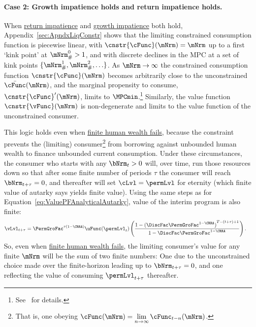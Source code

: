 \documentclass[BufferStockTheory]{subfiles}
\begin{document}
\paragraph{Case 2: Growth impatience holds and return impatience holds.}
When  \hyperlink{RIC}{return impatience} and  \hyperlink{GIC}{growth impatience} both hold, Appendix~\ref{sec:ApndxLiqConstr} shows that the limiting constrained consumption function is piecewise linear, with $\cnstr{\cFunc}(\mNrm)=\mNrm$ up to a first `kink point' at $\mNrm_{\#}^{0}>1$, and with discrete declines in the MPC at a set of kink points $\{\mNrm_{\#}^{1},\mNrm_{\#}^{2},\ldots\}$.
As $\mNrm \rightarrow \infty$ the constrained consumption function $\cnstr{\cFunc}(\mNrm)$ becomes arbitrarily close to the unconstrained $\bar{\cFunc}(\mNrm)$, and the marginal propensity to consume, $\cnstr{\cFunc}^{\prime}(\mNrm)$, limits to $\MPCmin$.\footnote{See~\cite{chkLiqConstr} for details.}
Similarly, the value function $\cnstr{\vFunc}(\mNrm)$ is non-degenerate and limits to the value function of the unconstrained consumer.


This logic holds even when \hyperlink{FHWC}{finite human wealth fails}, because the constraint prevents the (limiting) consumer\footnote{That is, one obeying $\cFunc(\mNrm) = \lim\limits_{n \rightarrow \infty} \cFunc_{t-n}(\mNrm)$.} from borrowing against unbounded human wealth to finance unbounded current consumption.
Under these circumstances, the consumer who starts with any $\bNrm_{t} > 0$ will, over time, run those resources down so that after some finite number of periods $\tau$ the consumer will reach $\bNrm_{t+\tau} = 0$, and thereafter will set $\cLvl = \permLvl$ for eternity (which \hypertarget{PFFVAC}{finite value of autarky} says yields finite value).
Using the same steps as for Equation~\eqref{eq:ValuePFAnalyticalAutarky}, value of the interim program is also finite: \hypertarget{PFFVAC}{}
\begin{align*}
  \vLvl_{t+\tau} 
  & = \PermGroFac^{\tau(1-\CRRA)} \uFunc(\permLvl_{t})\left(\frac{1-{(\DiscFac \PermGroFac^{1-\CRRA})}^{T-(t+\tau)+1}}{1-\DiscFac \PermGroFac^{1-\CRRA}}\right).
\end{align*}
So, even when \hyperlink{FHWC}{finite human wealth fails}, the limiting consumer's value for any finite $\mNrm$ will be the sum of two finite numbers: One due to the unconstrained choice made over the finite-horizon leading up to $\bNrm_{t+\tau} = 0$, and one reflecting the value of consuming $\permLvl_{t+\tau}$ thereafter.
\end{document}
